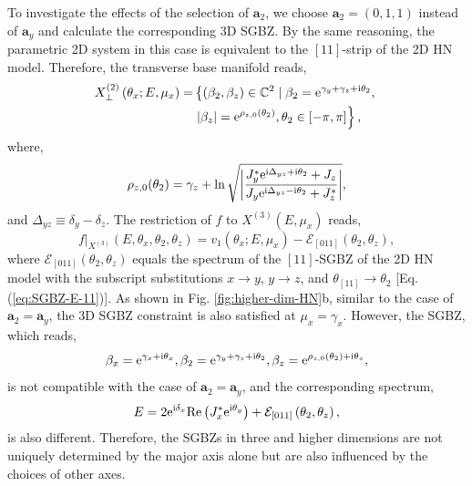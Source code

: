 \documentclass[pdflatex,sn-nature, iicol]{sn-jnl}%
\theoremstyle{thmstyleone}%
\theoremstyle{thmstyletwo}%
\theoremstyle{thmstylethree}%
\begin{document}
To investigate the effects of the selection of $\mathbf{a}_{2}$,
we choose $\mathbf{a}_{2}=(0,1,1)$ instead of $\mathbf{a}_{y}$ and
calculate the corresponding 3D SGBZ. By the same reasoning, the parametric
2D system in this case is equivalent to the $[11]$-strip of the 2D
HN model. Therefore, the transverse base manifold reads, 
\begin{align}
X_{\perp}^{(2)}\left(\theta_{x};E,\mu_{x}\right)= & \left\{ \left(\beta_{2},\beta_{z}\right)\in\mathbb{C}^{2}\mid\beta_{2}=\mathrm{e}^{\gamma_{y}+\gamma_{z}+\mathrm{i}\theta_{2}},\right.\nonumber \\
 & \left.\left|\beta_{z}\right|=\mathrm{e}^{\rho_{z,0}(\theta_{2})},\theta_{2}\in[-\pi,\pi]\right\} ,
\end{align}
where, 
\begin{equation}
\rho_{z,0}(\theta_{2})=\gamma_{z}+\ln\sqrt{\left|\frac{J_{y}^{*}\mathrm{e}^{\mathrm{i}\Delta_{yz}+\mathrm{i}\theta_{2}}+J_{z}}{J_{y}\mathrm{e}^{\mathrm{i}\Delta_{yz}-\mathrm{i}\theta_{2}}+J_{z}^{*}}\right|},
\end{equation}
and $\Delta_{yz}\equiv\delta_{y}-\delta_{z}$. The restriction of
$f$ to $X^{(3)}(E,\mu_{x})$ reads, 
\begin{equation}
f|_{X^{(3)}}\left(E,\theta_{x},\theta_{2},\theta_{z}\right)=v_{1}\left(\theta_{x};E,\mu_{x}\right)-\mathcal{E}_{[011]}\left(\theta_{2},\theta_{z}\right),
\end{equation}
where $\mathcal{E}_{[011]}(\theta_{2},\theta_{z})$ equals the spectrum
of the $[11]$-SGBZ of the 2D HN model with the subscript substitutions
$x\rightarrow y$, $y\rightarrow z$, and $\theta_{[11]}\rightarrow\theta_{2}$
{[}Eq. (\ref{eq:SGBZ-E-11}){]}. As shown in Fig. \ref{fig:higher-dim-HN}b,
similar to the case of $\mathbf{a}_{2}=\mathbf{a}_{y}$, the 3D SGBZ
constraint is also satisfied at $\mu_{x}=\gamma_{x}$. However, the
SGBZ, which reads, 
\begin{equation}
\beta_{x}=\mathrm{e}^{\gamma_{x}+\mathrm{i}\theta_{x}},\beta_{2}=\mathrm{e}^{\gamma_{y}+\gamma_{z}+\mathrm{i}\theta_{2}},\beta_{z}=\mathrm{e}^{\rho_{z,0}(\theta_{2})+\mathrm{i}\theta_{z}},
\end{equation}
is not compatible with the case of $\mathbf{a}_{2}=\mathbf{a}_{y}$,
and the corresponding spectrum, 
\begin{equation}
E=2\mathrm{e}^{\mathrm{i}\delta_{x}}\text{Re}\left(J_{x}^{*}\mathrm{e}^{\mathrm{i}\theta_{y}}\right)+\mathcal{E}_{[011]}\left(\theta_{2},\theta_{z}\right),
\end{equation}
is also different. Therefore, the SGBZs in three and higher dimensions
are not uniquely determined by the major axis alone but are also influenced
by the choices of other axes.
\end{document}
